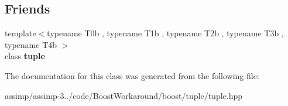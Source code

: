 \subsection*{Friends}
\begin{DoxyCompactItemize}
\item 
\hypertarget{classboost_1_1tuple_a097908bab565a7366796d743bc47016a}{{\footnotesize template$<$typename T0b , typename T1b , typename T2b , typename T3b , typename T4b $>$ }\\class {\bfseries tuple}}\label{classboost_1_1tuple_a097908bab565a7366796d743bc47016a}

\end{DoxyCompactItemize}


The documentation for this class was generated from the following file\+:\begin{DoxyCompactItemize}
\item 
assimp/assimp-\/3../code/\+Boost\+Workaround/boost/tuple/tuple.\+hpp\end{DoxyCompactItemize}
